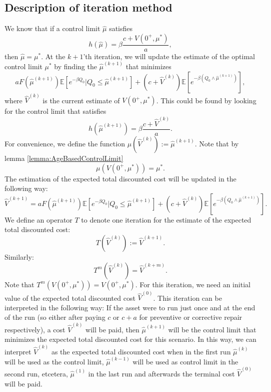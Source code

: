 \documentclass[a4paper]{thesis}
\theoremstyle{definition}
\begin{document}
\subsection{Description of iteration method}\label{section:AgeBasedIterationDescription}
We know that if a control limit $\hat{\mu}$ satisfies
\[h(\hat{\mu})=\beta\frac{c+V(0^+,\mu^*)}{a},\]
then $\hat{\mu}=\mu^*$.
At the $k+1$'th iteration, we will update the estimate of the optimal control limit $\mu^*$ by finding the $\hat{\mu}^{(k+1)}$ that minimizes
\[
aF(\hat{\mu}^{(k+1)})\mathbb{E}[e^{-\beta Q_0}|Q_0\leq \hat{\mu}^{(k+1)}]+(c+\hat{V}^{(k)})\mathbb{E}[e^{-\beta(Q_0\wedge\hat{\mu}^{(k+1)})}],
\]
where $\hat{V}^{(k)}$ is the current estimate of $V(0^+,\mu^*)$.
This could be found by looking for the control limit that satisfies
\begin{equation}\label{eq:AgeBasedIterationBound}
h(\hat{\mu}^{(k+1)})=\beta\frac{c+\hat{V}^{(k)}}{a}.\end{equation}
For convenience, we define the function $\mu(\hat{V}^{(k)}):=\hat{\mu}^{(k+1)}$.
Note that by lemma \ref{lemma:AgeBasedControlLimit}
\begin{equation}\label{eq:AgeBasedIterationControlConvergence}
\mu(V(0^+,\mu^*))=\mu^*.
\end{equation}
The estimation of the expected total discounted cost will be updated in the following way:
\[\hat{V}^{(k+1)}=aF(\hat{\mu}^{(k+1)})\mathbb{E}[e^{-\beta Q_0}|Q_0\leq \hat{\mu}^{(k+1)}]+(c+\hat{V}^{(k)})\mathbb{E}[e^{-\beta(Q_0\wedge\hat{\mu}^{(k+1)})}].\]
We define an operator $T$ to denote one iteration for the estimate of the expected total discounted cost:
\[T(\hat{V}^{(k)}):=\hat{V}^{(k+1)}.\]
Similarly:
\[T^m(\hat{V}^{(k)})=\hat{V}^{(k+m)}.\]
Note that $T^m(V(0^+,\mu^*))=V(0^+,\mu^*)$.
For this iteration, we need an initial value of the expected total discounted cost $\hat{V}^{(0)}$.
This iteration can be interpreted in the following way:
If the asset were to run just once and at the end of the run (so either after paying $c$ or $c+a$ for preventive or corrective repair respectively), a cost $\hat{V}^{(k)}$ will be paid, then $\hat{\mu}^{(k+1)}$ will be the control limit that minimizes the expected total discounted cost for this scenario.
In this way, we can interpret $\hat{V}^{(k)}$ as the expected total discounted cost when in the first run $\hat{\mu}^{(k)}$ will be used as the control limit, $\hat{\mu}^{(k-1)}$ will be used as control limit in the second run, etcetera, $\hat{\mu}^{(1)}$ in the last run and afterwards the terminal cost $\hat{V}^{(0)}$ will be paid.
\end{document}
